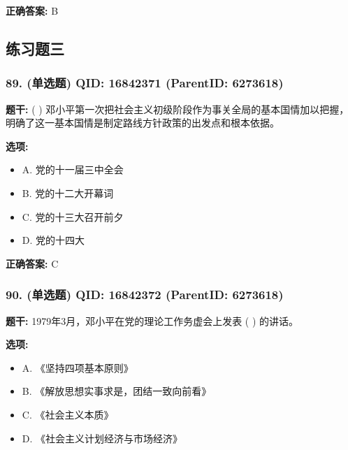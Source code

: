 \documentclass[12pt,UTF8]{ctexart}
\begin{document}
\textbf{正确答案:}
B

\vspace{0.3em}\hrulefill\vspace{0.7em}

\subsection*{练习题三}

\subsubsection*{89. (单选题) \small QID: 16842371 (ParentID: 6273618)}

\textbf{题干:}
( ) 邓小平第一次把社会主义初级阶段作为事关全局的基本国情加以把握，明确了这一基本国情是制定路线方针政策的出发点和根本依据。



\textbf{选项:}
\begin{itemize}[leftmargin=*]

  \item A. 党的十一届三中全会

  \item B. 党的十二大开幕词

  \item C. 党的十三大召开前夕

  \item D. 党的十四大

\end{itemize}

\textbf{正确答案:}
C

\vspace{0.3em}\hrulefill\vspace{0.7em}

\subsubsection*{90. (单选题) \small QID: 16842372 (ParentID: 6273618)}

\textbf{题干:}
1979年3月，邓小平在党的理论工作务虚会上发表 ( ) 的讲话。



\textbf{选项:}
\begin{itemize}[leftmargin=*]

  \item A. 《坚持四项基本原则》

  \item B. 《解放思想实事求是，团结一致向前看》

  \item C. 《社会主义本质》

  \item D. 《社会主义计划经济与市场经济》

\end{itemize}
\end{document}
